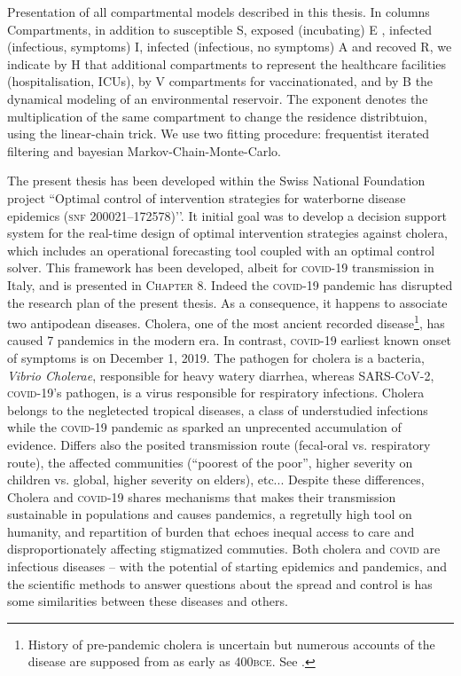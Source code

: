 \begin{table}[t]
\caption[Presentation of the models described in this thesis]{Presentation of all  compartmental models described in this thesis. In columns Compartments, in addition to susceptible S, exposed (incubating) E , infected (infectious, symptoms) I, infected (infectious, no symptoms) A and recoved R, we indicate by H that additional compartments to represent the healthcare facilities (hospitalisation, ICUs), by V compartments for vaccinationated, and by B the dynamical modeling of an environmental reservoir. The exponent denotes the multiplication of the same compartment to change the residence distribtuion, using the linear-chain trick. We use two fitting procedure: frequentist iterated filtering and bayesian Markov-Chain-Monte-Carlo.}
\end{table}
The present thesis has been developed within the Swiss National Foundation project ``Optimal control of intervention strategies for waterborne disease epidemics (\textsc{snf} 200021–172578)’’. It initial goal was to develop a decision support system for the real-time design of optimal intervention strategies against cholera, which includes an operational forecasting tool coupled with an optimal control solver. This framework has been developed, albeit for \textsc{covid}-19 transmission in Italy, and is presented in \textsc{Chapter 8}. Indeed the \textsc{covid}-19 pandemic has disrupted the research plan of the present thesis. As a consequence, it happens to associate two antipodean diseases. Cholera, one of the most ancient recorded disease\footnote[][10\baselineskip]{History of pre-pandemic cholera is uncertain but numerous accounts of the disease are supposed from as early as 400\textsc{bce}. See .}, has caused 7 pandemics in the modern era. In contrast, \textsc{covid}-19 earliest known onset of symptoms is on December 1, 2019. The pathogen for cholera is a bacteria, \textit{Vibrio Cholerae}, responsible for heavy watery diarrhea, whereas \textsc{SARS-CoV-2}, \textsc{covid}-19’s pathogen, is a virus responsible for respiratory infections. Cholera belongs to the negletected tropical diseases, a class of understudied infections while the \textsc{covid}-19 pandemic as sparked an unprecented accumulation of evidence\cite{COVID-19OpenAccessProject:LivingEvidenceCOVID19:2020}. Differs also the posited transmission route (fecal-oral vs. respiratory route), the affected communities (``poorest of the poor”, higher severity on children vs. global, higher severity on elders), etc... Despite these differences, Cholera and \textsc{covid}-19 shares mechanisms that makes their transmission sustainable in populations and causes pandemics, a regretully high tool on humanity, and repartition of burden that echoes inequal access to care and disproportionately affecting stigmatized commuties. Both cholera and \textsc{covid} are infectious diseases -- with the potential of starting epidemics and pandemics, and the scientific methods to answer questions about the spread and control is has some similarities between these diseases and others.


